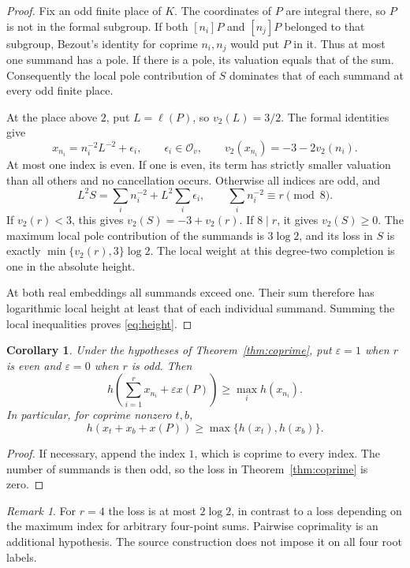 \documentclass[11pt]{article}
\newtheorem{corollary}[theorem]{Corollary}
\theoremstyle{remark}\newtheorem{remark}[theorem]{Remark}
\begin{document}
\begin{proof}
Fix an odd finite place of $K$.  The coordinates of $P$ are integral
there, so $P$ is not in the formal subgroup.  If both $[n_i]P$ and
$[n_j]P$ belonged to that subgroup, Bezout's identity for coprime
$n_i,n_j$ would put $P$ in it.  Thus at most one summand has a pole.
If there is a pole, its valuation equals that of the sum.  Consequently
the local pole contribution of $S$ dominates that of each summand at
every odd finite place.

At the place above $2$, put $L=\ell(P)$, so $v_2(L)=3/2$.
The formal identities give
\[
x_{n_i}=n_i^{-2}L^{-2}+\epsilon_i,
\qquad \epsilon_i\in\mathcal O_v,
\qquad v_2(x_{n_i})=-3-2v_2(n_i).
\]
At most one index is even.  If one is even, its term has strictly
smaller valuation than all others and no cancellation occurs.
Otherwise all indices are odd, and
\[
L^2S=\sum_i n_i^{-2}+L^2\sum_i\epsilon_i,
\qquad
\sum_i n_i^{-2}\equiv r\pmod8.
\]
If $v_2(r)<3$, this gives $v_2(S)=-3+v_2(r)$.
If $8\mid r$, it gives $v_2(S)\ge0$.
The maximum local pole contribution of the summands is $3\log2$,
and its loss in $S$ is exactly
$\min\{v_2(r),3\}\log2$.  The local weight at this degree-two
completion is one in the absolute height.

At both real embeddings all summands exceed one.  Their sum therefore
has logarithmic local height at least that of each individual summand.
Summing the local inequalities proves \eqref{eq:height}.
\end{proof}

\begin{corollary}\label{cor:shift}
Under the hypotheses of Theorem~\ref{thm:coprime}, put
$\varepsilon=1$ when $r$ is even and $\varepsilon=0$ when $r$ is odd.
Then
\[
h\left(\sum_{i=1}^r x_{n_i}+\varepsilon x(P)\right)
 \ge\max_i h(x_{n_i}).
\]
In particular, for coprime nonzero $t,b$,
\[
h(x_t+x_b+x(P))\ge\max\{h(x_t),h(x_b)\}.
\]
\end{corollary}

\begin{proof}
If necessary, append the index $1$, which is coprime to every index.
The number of summands is then odd, so the loss in
Theorem~\ref{thm:coprime} is zero.
\end{proof}

\begin{remark}
For $r=4$ the loss is at most $2\log2$, in contrast to a loss depending
on the maximum index for arbitrary four-point sums.  Pairwise
coprimality is an additional hypothesis.  The source construction does
not impose it on all four root labels.
\end{remark}
\end{document}
